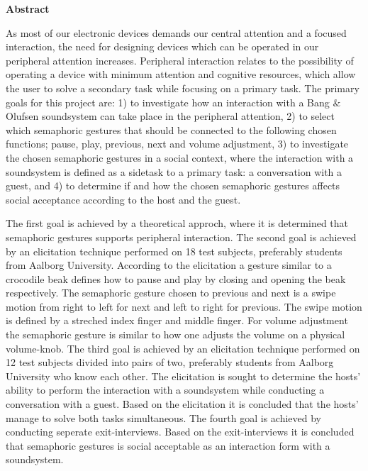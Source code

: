 \begin{center}
	\textbf{{\huge Abstract}}
\end{center}
%
As most of our electronic devices demands our central attention and a focused interaction, the need for designing devices which can be operated in our peripheral attention increases. Peripheral interaction relates to the possibility of operating a device with minimum attention and cognitive resources, which allow the user to solve a secondary task while focusing on a primary task. The primary goals for this project are: 1) to investigate how an interaction with a Bang $\&$ Olufsen soundsystem can take place in the peripheral attention, 2) to select which semaphoric gestures that should be connected to the following chosen functions; pause, play, previous, next and volume adjustment, 3) to investigate the chosen semaphoric gestures in a social context, where the interaction with a soundsystem is defined as a sidetask to a primary task: a conversation with a guest, and 4) to determine if and how the chosen semaphoric gestures affects social acceptance according to the host and the guest.            

The first goal is achieved by a theoretical approch, where it is determined that semaphoric gestures supports peripheral interaction. The second goal is achieved by an elicitation technique performed on 18 test subjects, preferably students from Aalborg University. According to the elicitation a gesture similar to a crocodile beak defines how to pause and play by closing and opening the beak respectively. The semaphoric gesture chosen to previous and next is a swipe motion from right to left for next and left to right for previous. The swipe motion is defined by a streched index finger and middle finger. For volume adjustment the semaphoric gesture is similar to how one adjusts the volume on a physical volume-knob. The third goal is achieved by an elicitation technique performed on 12 test subjects divided into pairs of two, preferably students from Aalborg University who know each other. The elicitation is sought to determine the hosts' ability to perform the interaction with a soundsystem while conducting a conversation with a guest. Based on the elicitation it is concluded that the hosts' manage to solve both tasks simultaneous. The fourth goal is achieved by conducting seperate exit-interviews. Based on the exit-interviews it is concluded that semaphoric gestures is social acceptable as an interaction form with a soundsystem.